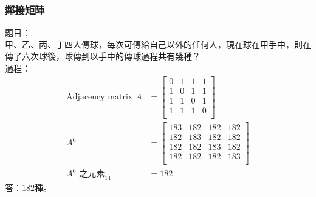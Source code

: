 \documentclass[a4paper,12pt]{report}
\begin{document}
\subsubsection{鄰接矩陣}
題目：\\
甲、乙、丙、丁四人傳球，每次可傳給自己以外的任何人，現在球在甲手中，則在傳了六次球後，球傳到以手中的傳球過程共有幾種？\\
過程：\\
\[
\begin{aligned}
\text{Adjacency matrix } A &=
\begin{bmatrix}
0 & 1 & 1 & 1 \\
1 & 0 & 1 & 1 \\
1 & 1 & 0 & 1 \\
1 & 1 & 1 & 0 \\
\end{bmatrix} \\
A^6 &=
\begin{bmatrix}
183 & 182 & 182 & 182 \\
182 & 183 & 182 & 182 \\
182 & 182 & 183 & 182 \\
182 & 182 & 182 & 183 \\
\end{bmatrix} \\
A^6\text{ 之元素}_{14} &= 182
\end{aligned}
\]
答：$182$種。
\end{document}
